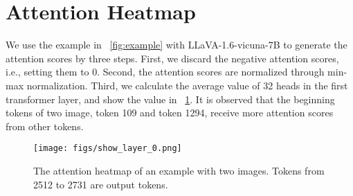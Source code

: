 


\section{Attention Heatmap}\label{sinks}
We use the example in \figurename~\ref{fig:example} with LLaVA-1.6-vicuna-7B to generate the attention scores by three steps. First, we discard the negative attention scores, i.e., setting them to 0. Second, the attention scores are normalized through min-max normalization. Third, we calculate the average value of 32 heads in the first transformer layer, and show the value in \figurename~\ref{fig:attn}. It is observed that the beginning tokens of two image, token 109 and token 1294, receive more attention scores from other tokens. 

\begin{figure}
    \centering
    \texttt{[image: figs/show\_layer\_0.png]}
    \caption{The attention heatmap of an example with two images. Tokens from 2512 to 2731 are output tokens.}
    \label{fig:attn}
\end{figure}
